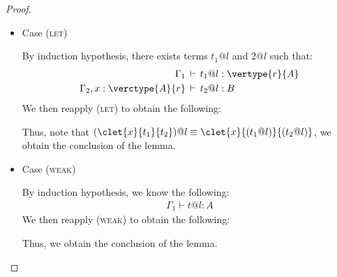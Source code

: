 \begin{proof}
\begin{itemize}
\item Case (\textsc{let})
\begin{center}
    \begin{minipage}{.70\linewidth}
    \end{minipage}
\end{center}
By induction hypothesis, there exists terms $t_1@l$ and $2@l$ such that:
\begin{align*}
\Gamma_1 \,&\vdash\, t_1@l : \vertype{r}{A}\\
\Gamma_2, x:\verctype{A}{r} \,&\vdash\, t_2@l : B
\end{align*}
We then reapply (\textsc{let}) to obtain the following:
\begin{center}
    \begin{minipage}{.75\linewidth}
    \end{minipage}
\end{center}
Thus, note that $(\clet{x}{t_1}{t_2})@l \equiv \clet{x}{(t_1@l)}{(t_2@l)}$, we obtain the conclusion of the lemma.
\\

\item Case (\textsc{weak})
\begin{center}
    \begin{minipage}{.45\linewidth}
    \end{minipage}
\end{center}
By induction hypothesis, we know the following:
\begin{align*}
\Gamma_1 \vdash t@l : A
\end{align*}
We then reapply (\textsc{weak}) to obtain the following:
\begin{center}
    \begin{minipage}{.45\linewidth}
    \end{minipage}
\end{center}
Thus, we obtain the conclusion of the lemma.
\\


\end{itemize}
\end{proof}
